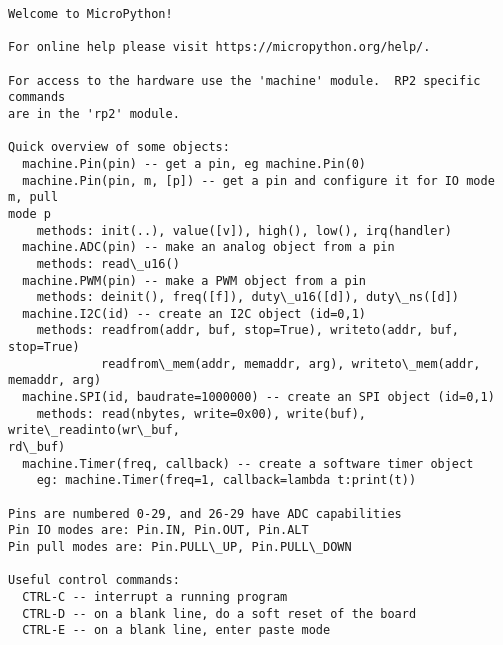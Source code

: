 \documentclass[11pt]{article}
\begin{document}
    \begin{Verbatim}[commandchars=\\\{\}]
Welcome to MicroPython!

For online help please visit https://micropython.org/help/.

For access to the hardware use the 'machine' module.  RP2 specific commands
are in the 'rp2' module.

Quick overview of some objects:
  machine.Pin(pin) -- get a pin, eg machine.Pin(0)
  machine.Pin(pin, m, [p]) -- get a pin and configure it for IO mode m, pull
mode p
    methods: init(..), value([v]), high(), low(), irq(handler)
  machine.ADC(pin) -- make an analog object from a pin
    methods: read\_u16()
  machine.PWM(pin) -- make a PWM object from a pin
    methods: deinit(), freq([f]), duty\_u16([d]), duty\_ns([d])
  machine.I2C(id) -- create an I2C object (id=0,1)
    methods: readfrom(addr, buf, stop=True), writeto(addr, buf, stop=True)
             readfrom\_mem(addr, memaddr, arg), writeto\_mem(addr, memaddr, arg)
  machine.SPI(id, baudrate=1000000) -- create an SPI object (id=0,1)
    methods: read(nbytes, write=0x00), write(buf), write\_readinto(wr\_buf,
rd\_buf)
  machine.Timer(freq, callback) -- create a software timer object
    eg: machine.Timer(freq=1, callback=lambda t:print(t))

Pins are numbered 0-29, and 26-29 have ADC capabilities
Pin IO modes are: Pin.IN, Pin.OUT, Pin.ALT
Pin pull modes are: Pin.PULL\_UP, Pin.PULL\_DOWN

Useful control commands:
  CTRL-C -- interrupt a running program
  CTRL-D -- on a blank line, do a soft reset of the board
  CTRL-E -- on a blank line, enter paste mode


\end{Verbatim}
\end{document}
